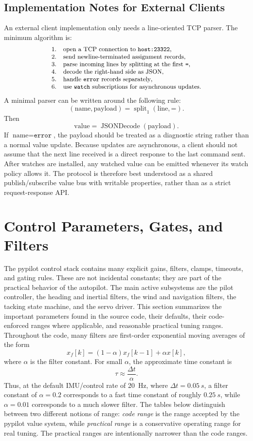 \documentclass[11pt,twocolumn]{article}
\begin{document}
\subsection{Implementation Notes for External Clients}
An external client implementation only needs a line-oriented TCP parser.
The minimum algorithm is:
\[
\small
\begin{array}{ll}
1. & \text{open a TCP connection to } \texttt{host:23322},\\
2. & \text{send newline-terminated assignment records},\\
3. & \text{parse incoming lines by splitting at the first } \texttt{=},\\
4. & \text{decode the right-hand side as JSON},\\
5. & \text{handle } \texttt{error} \text{ records separately},\\
6. & \text{use } \texttt{watch} \text{ subscriptions for asynchronous updates}.
\end{array}
\]
A minimal parser can be written around the following rule:
\[
(\text{name},\text{payload})
=
\operatorname{split}_{1}(\text{line},\texttt{=}).
\]
Then
\[
\text{value} = \operatorname{JSONDecode}(\text{payload}).
\]
If \(\text{name}=\texttt{error}\), the payload should be treated as a
diagnostic string rather than a normal value update.
Because updates are asynchronous, a client should not assume that the next
line received is a direct response to the last command sent.  After watches
are installed, any watched value can be emitted whenever its watch policy
allows it.  The protocol is therefore best understood as a shared
publish/subscribe value bus with writable properties, rather than as a
strict request-response API.

\section{Control Parameters, Gates, and Filters}
\label{sec:pypilot-parameters}
The pypilot control stack contains many explicit gains, filters, clamps,
timeouts, and gating rules.  These are not incidental constants; they are
part of the practical behavior of the autopilot.  The main active
subsystems are the pilot controller, the heading and inertial filters, the
wind and navigation filters, the tacking state machine, and the servo
driver.  This section summarizes the important parameters found in the
source code, their defaults, their code-enforced ranges where applicable,
and reasonable practical tuning ranges.
Throughout the code, many filters are first-order exponential moving
averages of the form
\[
x_f[k]
=
(1-\alpha)x_f[k-1] + \alpha x[k],
\]
where \(\alpha\) is the filter constant.  For small \(\alpha\), the
approximate time constant is
\[
\tau \approx \frac{\Delta t}{\alpha}.
\]
Thus, at the default IMU/control rate of \SI{20}{Hz}, where
\(\Delta t = \SI{0.05}{s}\), a filter constant of \(\alpha=0.2\)
corresponds to a fast time constant of roughly \(\SI{0.25}{s}\), while
\(\alpha=0.01\) corresponds to a much slower filter.
The tables below distinguish between two different notions of range:
\emph{code range} is the range accepted by the pypilot value system, while
\emph{practical range} is a conservative operating range for real tuning.
The practical ranges are intentionally narrower than the code ranges.
\end{document}
